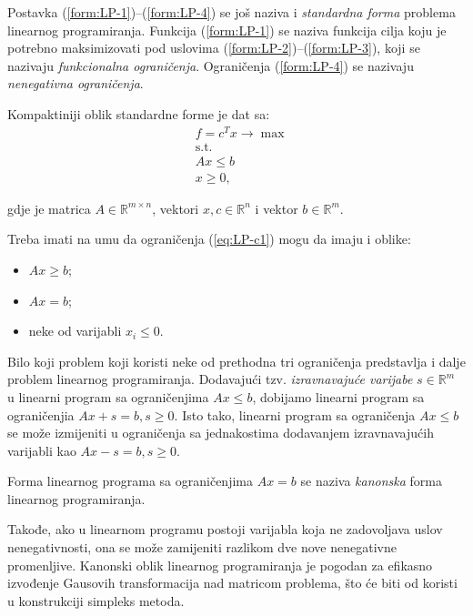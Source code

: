\documentclass[a4paper, utf8, 11pt, colorlinks]{book}
\begin{document}
Postavka (\ref{form:LP-1})--(\ref{form:LP-4}) se još naziva i \emph{standardna forma} problema linearnog programiranja. Funkcija (\ref{form:LP-1}) se naziva funkcija cilja koju je potrebno maksimizovati pod uslovima (\ref{form:LP-2})--(\ref{form:LP-3}), koji se nazivaju \emph{funkcionalna ograničenja}. Ograničenja (\ref{form:LP-4}) se nazivaju \emph{nenegativna ograničenja}. 

Kompaktiniji oblik standardne forme je dat sa:
\begin{align}
    & f = c^T x \rightarrow \max \label{eq:LP-o1}\\
    & \mbox{s.t.} \nonumber \\
    &  A x \leq b \label{eq:LP-c1} \\
    & x \geq 0 \label{eq:LP-c2},
\end{align}

gdje je matrica $A \in \mathbb{R}^{m \times n}$, vektori  $x,c \in \mathbb{R}^n$ i vektor $b \in \mathbb{R}^{m}$.

Treba imati na umu da ograničenja (\ref{eq:LP-c1}) mogu da imaju i oblike:
\begin{itemize}
    \item $Ax \geq b$;
    \item $Ax = b$;
    \item neke od varijabli $x_i\leqslant 0$.
\end{itemize}
Bilo koji problem koji koristi neke od prethodna tri ograničenja predstavlja i dalje problem linearnog programiranja. Dodavajući tzv. \emph{izravnavajuće varijabe} $s \in \mathbb{R}^m$ u linearni program sa ograničenjima $Ax \leq b$, dobijamo linearni program sa ograničenjia $Ax + s = b, s \geq 0$. Isto tako, linearni program sa ograničenja $Ax \leq b$ se može izmijeniti u ograničenja sa jednakostima dodavanjem izravnavajućih varijabli kao $Ax - s = b, s\geq 0$.

 Forma linearnog programa sa ograničenjima $Ax = b$ se naziva \emph{kanonska} forma linearnog programiranja. 
 
 Takođe, ako u linearnom
programu postoji varijabla koja ne zadovoljava uslov nenegativnosti, ona se može zamijeniti razlikom dve nove nenegativne promenljive. Kanonski oblik linearnog programiranja je pogodan za efikasno izvođenje Gausovih transformacija  nad matricom problema, što će biti od koristi u konstrukciji simpleks metoda.   %
\end{document}
